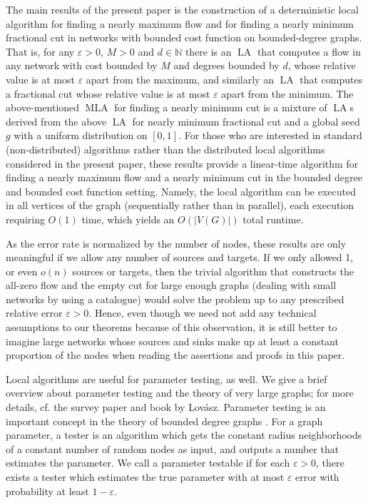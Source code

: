 \documentclass[12pt,a4paper]{article}
\newcommand{\eps}{\varepsilon}
\renewcommand{\:}{\colon}
\DeclareMathOperator{\LA}{LA}
\DeclareMathOperator{\MLA}{MLA}
\begin{document}
The main results of the present paper is the construction of a deterministic local algorithm for finding a nearly maximum flow and for finding a nearly minimum fractional cut in networks with bounded cost function on bounded-degree graphs. 
That is, for any $\eps>0$, $M>0$ and $d\in \mathbb{N}$ there is an $\LA$ that computes a flow in any network with cost bounded by $M$ and degrees bounded by $d$, whose relative value is at most $\eps$ apart from the maximum, and similarly an $\LA$ that computes a fractional cut whose relative value is at most $\eps$ apart from the minimum. 
The above-mentioned $\MLA$ for finding a nearly minimum cut is a mixture of $\LA$s derived from the above $\LA$ for nearly minimum fractional cut and a global seed $g$ with a uniform distribution on $[0,1]$. 
For those who are interested in standard (non-distributed) algorithms rather than the distributed local algorithms considered in the present paper, these results provide a linear-time algorithm for finding a nearly maximum flow and a nearly minimum cut in the bounded degree and bounded cost function setting. 
Namely, the local algorithm can be executed in all vertices of the graph (sequentially rather than in parallel), each execution requiring $O(1)$ time, which yields an $O(|V(G)|)$ total runtime. 

As the error rate is normalized by the number of nodes, these results are only meaningful if we allow any number of sources and targets. 
If we only allowed 1, or even $o(n)$ sources or targets, then the trivial algorithm that constructs the all-zero flow and the empty cut for large enough graphs (dealing with small networks by using a catalogue) would solve the problem up to any prescribed relative error $\eps>0$. 
Hence, even though we need not add any technical assumptions to our theorems because of this observation, it is still better to imagine large networks whose sources and sinks make up at least a constant proportion of the nodes when reading the assertions and proofs in this paper. 



Local algorithms are useful for parameter testing, as well. 
We give a brief overview about parameter testing and the theory of very large graphs; for more details, cf. the survey paper and book \cite{Lovasz, Lovaszbook} by Lov\'asz. 
Parameter testing is an important concept in the theory of bounded degree graphs \cite{BeSchSh, BObT, CzuShaSo, Elek2, Elek, LOW, MaRo, NgOn}. 
For a graph parameter, a tester is an algorithm which gets the constant radius neighborhoods of a constant number of random nodes as input, and outputs a number that estimates the parameter. 
We call a parameter testable if for each $\eps > 0$, there exists a tester which estimates the true parameter with at most $\eps$ error with probability at least $1 - \eps$.
\end{document}
